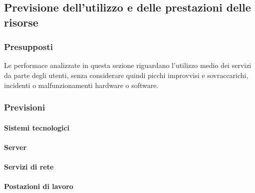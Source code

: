 \newpage
\subsection{Previsione dell'utilizzo e delle prestazioni delle risorse}

	\subsubsection{Presupposti}
Le performace analizzate in questa sezione riguardano l'utilizzo medio dei servizi da parte degli utenti, senza considerare quindi picchi improvvisi e sovraccarichi, incidenti o malfunzionamenti hardware o software.
\subsubsection{Previsioni}

	\paragraph{Sistemi tecnologici}
	\paragraph{Server}
	\paragraph{Servizi di rete}
	\paragraph{Postazioni di lavoro}




